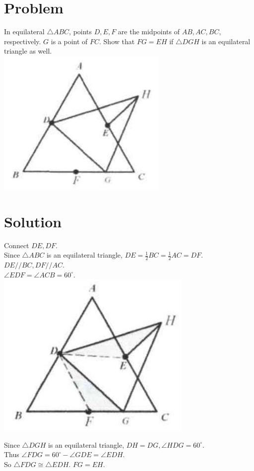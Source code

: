 \documentclass{article}
\begin{document}
\section*{Problem}
In equilateral \(\triangle A B C\), points \(D, E, F\) are the midpoints of \(A B, A C, B C\), respectively. \(G\) is a point of \(F C\). Show that \(F G=E H\) if \(\triangle D G H\) is an equilateral triangle as well.\\
\centering
\includegraphics[width=\textwidth]{images/045(3).jpg}

\section*{Solution}
Connect \(D E, D F\).\\
Since \(\triangle A B C\) is an equilateral triangle, \(D E=\frac{1}{2} B C=\frac{1}{2} A C=D F\).\\
\(D E / / B C, D F / / A C\).\\
\(\angle E D F=\angle A C B=60^{\circ}\).\\
\centering
\includegraphics[width=\textwidth]{images/051(2).jpg}

Since \(\triangle D G H\) is an equilateral triangle, \(D H=D G, \angle H D G=60^{\circ}\).\\
Thus \(\angle F D G=60^{\circ}-\angle G D E=\angle E D H\).\\
So \(\triangle F D G \cong \triangle E D H\). \(F G=E H\).
\end{document}
